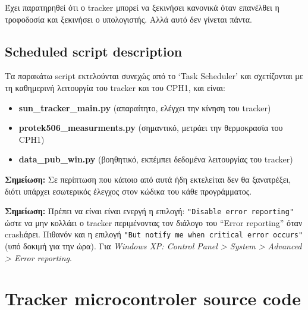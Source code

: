 \documentclass[
  a4paper,
  twoside,
  titlepage,
  12pt]{article}
\providecommand{\tightlist}{%
  \setlength{\itemsep}{0pt}\setlength{\parskip}{0pt}}
\numberwithin{equation}{section}
\numberwithin{figure}{section}
\numberwithin{table}{section}
\begin{document}
Έχει παρατηρηθεί ότι ο tracker μπορεί να ξεκινήσει κανονικά όταν επανέλθει η τροφοδοσία και ξεκινήσει ο υπολογιστής. Αλλά αυτό δεν γίνεται πάντα.

\vspace{-1\baselineskip}

\hypertarget{scheduled-script-description}{%
\subsection*{Scheduled script description}\label{scheduled-script-description}}

\vspace{-0.7\baselineskip}

Τα παρακάτω script εκτελούνται συνεχώς από το `Task Scheduler' και σχετίζονται με τη καθημερινή λειτουργία του tracker και του CPH1, και είναι:

\begin{itemize}
\tightlist
\item
  \textbf{sun\_tracker\_main.py} (απαραίτητο, ελέγχει την κίνηση του tracker)
\item
  \textbf{protek506\_measurments.py} (σημαντικό, μετράει την θερμοκρασία του CPH1)
\item
  \textbf{data\_pub\_win.py} (βοηθητικό, εκπέμπει δεδομένα λειτουργίας του tracker)
\end{itemize}

\textbf{Σημείωση:} Σε περίπτωση που κάποιο από αυτά ήδη εκτελείται δεν θα ξανατρέξει, διότι υπάρχει εσωτερικός έλεγχος στον κώδικα του κάθε προγράμματος.

\textbf{Σημείωση:} Πρέπει να είναι είναι ενεργή η επιλογή: \texttt{"Disable\ error\ reporting"} ώστε να μην κολλάει ο tracker περιμένοντας τον διάλογο του ``Error reporting'' όταν crashάρει. Πιθανόν και η επιλογή \texttt{"But\ notify\ me\ when\ critical\ error\ occurs"} (υπό δοκιμή για την ώρα). Για \emph{Windows XP: Control Panel \textgreater{} System \textgreater{} Advanced \textgreater{} Error reporting}.

\hypertarget{tracker-microcontroler-source-code}{%
\section{Tracker microcontroler source code}\label{tracker-microcontroler-source-code}}

\tiny
\end{document}
